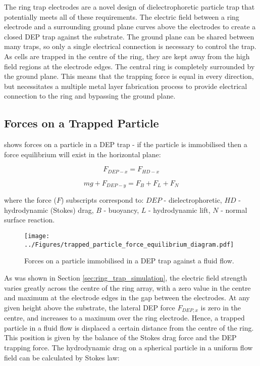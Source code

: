 The ring trap electrodes are a novel design of dielectrophoretic particle trap that potentially meets all of these requirements. The electric field between a ring electrode and a surrounding ground plane curves above the electrodes to create a closed DEP trap against the substrate. The ground plane can be shared between many traps, so only a single electrical connection is necessary to control the trap. As cells are trapped in the centre of the ring, they are kept away from the high field regions at the electrode edges. The central ring is completely surrounded by the ground plane. This means that the trapping force is equal in every direction, but necessitates a multiple metal layer fabrication process to provide electrical connection to the ring and bypassing the ground plane.

\subsection{Forces on a Trapped Particle}

 shows forces on a particle in a DEP trap - if the particle is immobilised then a force equilibrium will exist in the horizontal plane:

\begin{equation}
F_{DEP-x} = F_{HD-x}
 \label{trapped_particle_force_equilibrium_x}
\end{equation} 

\begin{equation}
mg + F_{DEP-y}= F_{B} + F_{L} + F_{N}
 \label{trapped_particle_force_equilibrium_y}
\end{equation}

where the force ($F$) subscripts correspond to: $DEP$ - dielectrophoretic, $HD$ - hydrodynamic (Stokes) drag, $B$ - buoyancy, $L$ - hydrodynamic lift, $N$ - normal surface reaction.


\begin{figure}
	\centering
		\texttt{[image: ../Figures/trapped\_particle\_force\_equilibrium\_diagram.pdf]}
	\caption{Forces on a particle immobilised in a DEP trap against a fluid flow.}
	\label{trapped_particle_force_equilibrium_diagram}
\end{figure}

As was shown in Section \ref{sec:ring_trap_simulation}, the electric field strength varies greatly across the centre of the ring array, with a zero value in the centre and maximum at the electrode edges in the gap between the electrodes.  At any given height above the substrate, the lateral DEP force $F_{DEP,x}$ is zero in the centre, and increases to a maximum over the ring electrode.  Hence, a trapped particle in a fluid flow is displaced a certain distance from the centre of the ring. This position is given by the balance of the Stokes drag force and the DEP trapping force. The hydrodynamic drag on a spherical particle in a uniform flow field can be calculated by Stokes law:

